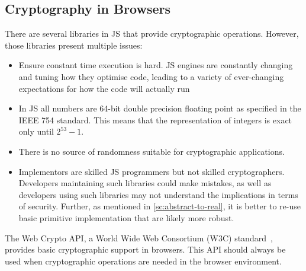 \subsection{Cryptography in Browsers}\label{sc:webcrypto-api}

There are several libraries in JS that provide cryptographic
operations.
However, those libraries present multiple issues:
\begin{itemize}
    \item Ensure constant time execution is hard. JS engines are constantly changing and tuning how they optimise code, leading to a variety of ever-changing expectations for how the code will actually run
    \item In JS all numbers are 64-bit double precision floating point as specified in the IEEE 754 standard. This means that the representation of integers is exact only until $2^{53} - 1$.
    \item There is no source of randomness suitable for cryptographic applications.
    \item Implementors are skilled JS programmers but not skilled cryptographers. Developers maintaining such libraries could make mistakes, as well as developers using such libraries may not understand the implications in terms of security. Further, as mentioned in \cref{sc:abstract-to-real}, it is better to re-use basic primitive implementation that are likely more robust. 
\end{itemize}

The Web Crypto API, a World Wide Web Consortium (W3C) standard~\cite{WebCryptoAPISpecification}, 
provides basic cryptographic support in browsers. This API should
always be used when cryptographic operations are needed in the browser
environment.

